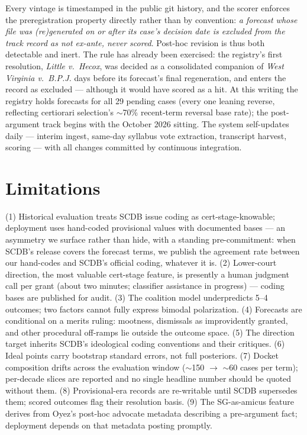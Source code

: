 \documentclass[11pt]{article}
\begin{document}
Every vintage is timestamped in the public git history, and the scorer enforces
the preregistration property directly rather than by convention: \emph{a
forecast whose file was (re)generated on or after its case's decision date is
excluded from the track record as not ex-ante, never scored}. Post-hoc revision
is thus both detectable and inert. The rule has already been exercised: the
registry's first resolution, \emph{Little v.\ Hecox}, was decided as a
consolidated companion of \emph{West Virginia v.\ B.P.J.} days before its
forecast's final regeneration, and enters the record as excluded --- although
it would have scored as a hit. At this writing the registry holds forecasts
for all 29 pending cases (every one leaning reverse, reflecting certiorari
selection's $\sim$70\% recent-term reversal base rate); the post-argument track
begins with the October 2026 sitting. The system self-updates daily ---
interim ingest, same-day syllabus vote extraction, transcript harvest,
scoring --- with all changes committed by continuous integration.

\section{Limitations}\label{sec:limitations}

(1) Historical evaluation treats SCDB issue coding as cert-stage-knowable;
deployment uses hand-coded provisional values with documented bases --- an
asymmetry we surface rather than hide, with a standing pre-commitment: when
SCDB's release covers the forecast terms, we publish the agreement rate between
our hand-codes and SCDB's official coding, whatever it is. (2) Lower-court
direction, the most valuable cert-stage feature, is presently a human judgment
call per grant (about two minutes; classifier assistance in progress) --- coding
bases are published for audit. (3) The coalition model underpredicts 5--4
outcomes; two factors cannot fully express bimodal polarization. (4) Forecasts
are conditional on a merits ruling: mootness, dismissals as improvidently
granted, and other procedural off-ramps lie outside the outcome space. (5) The
direction target inherits SCDB's ideological coding conventions and their
critiques. (6) Ideal points carry bootstrap standard errors, not full
posteriors. (7) Docket composition drifts across the evaluation window
($\sim$150 $\to$ $\sim$60 cases per term); per-decade slices are reported and no
single headline number should be quoted without them. (8) Provisional-era
records are re-writable until SCDB supersedes them; scored outcomes flag their
resolution basis. (9) The SG-as-amicus feature derives from Oyez's post-hoc
advocate metadata describing a pre-argument fact; deployment depends on that
metadata posting promptly.
\end{document}
